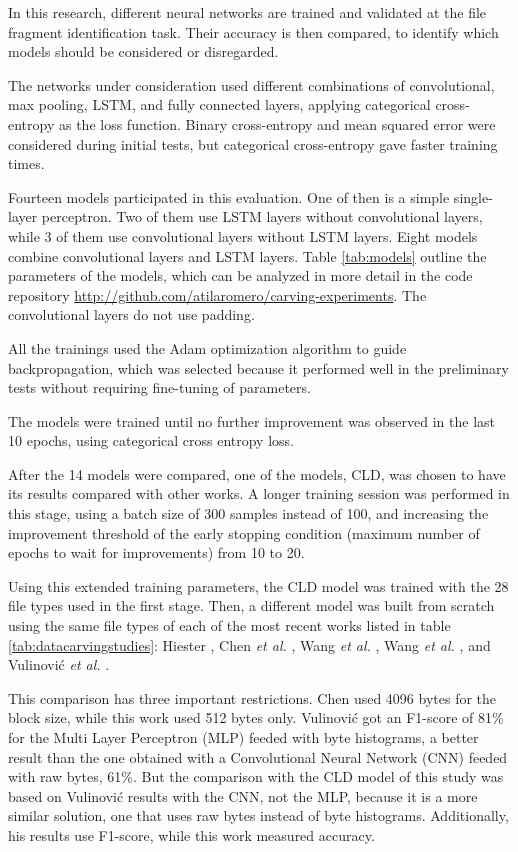In this research, different neural networks are trained and validated
at the file fragment identification task. Their accuracy is then compared,
to identify which models should be considered or disregarded.

The networks under consideration used different combinations of convolutional, max pooling, LSTM, and fully connected layers,
applying categorical cross-entropy as the loss function. Binary cross-entropy and mean squared error were considered during initial tests, but categorical cross-entropy gave faster training times.

Fourteen models participated in this evaluation. One of then is a simple single-layer perceptron. Two of them use LSTM layers without convolutional layers, while 3 of them use convolutional layers without LSTM layers. Eight models combine convolutional layers and LSTM layers. Table \ref{tab:models} outline the parameters of the models, which can be analyzed in more detail in the code repository \sloppy\url{http://github.com/atilaromero/carving-experiments}. The convolutional layers do not use padding. 



All the trainings used the Adam \cite{kingma_adam:_2014}
optimization algorithm to guide backpropagation, which was selected because it performed well in the preliminary tests without requiring fine-tuning of parameters.

The models were trained until no further improvement was observed in the last 10 epochs, using categorical cross entropy loss.

After the 14 models were compared, one of the models, CLD, was chosen to have its results compared with other works. A longer training session was performed in this stage, using a batch size of 300 samples instead of 100, and increasing the improvement threshold of the early stopping condition (maximum number of epochs to wait for improvements) from 10 to 20.

Using this extended training parameters, the CLD model was trained with the 28 file types used in the first stage. Then, a different model was built from scratch using the same file types of each of the most recent works listed in table \ref{tab:datacarvingstudies}: 
Hiester \cite{hiester_file_2018}, 
Chen \textit{et al.} \cite{chen_file_2018},
Wang \textit{et al.} \cite{wang_sparse_2018},
Wang \textit{et al.} \cite{wang_file_2018},
and
Vulinović \textit{et al.} \cite{vulinovic_neural_2019}.

This comparison has three important restrictions.
Chen used 4096 bytes for the block size, while this work used 512 bytes only.
Vulinović got an F1-score of 81\% for the Multi Layer Perceptron (MLP) feeded with byte histograms, a better result than the one obtained with a Convolutional Neural Network (CNN) feeded with raw bytes, 61\%. But the comparison with the CLD model of this study was based on Vulinović results with the CNN, not the MLP, because it is a more similar solution, one that uses raw bytes instead of byte histograms. Additionally, his results use F1-score, while this work measured accuracy. 

